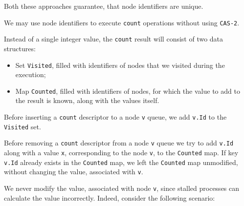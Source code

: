 \documentclass[times, dvipsnames,%
               languages={russian,english} %
              ]{itmo-student-thesis}
\begin{document}
\bigbreak

Both these approaches guarantee, that node identifiers are unique.

We may use node identifiers to execute \texttt{count} operations without using \texttt{CAS-2}. 

Instead of a single integer value, the \texttt{count} result will consist of two data structures:

\begin{itemize}
    \item Set \texttt{Visited}, filled with identifiers of nodes that we visited during the execution;
    
    \item Map \texttt{Counted}, filled with identifiers of nodes, for which the value to add to the result is known, along with the values itself.  
\end{itemize}

\bigbreak

Before inserting a \texttt{count} descriptor to a node \texttt{v} queue, we add \texttt{v.Id} to the \texttt{Visited} set. 

Before removing a \texttt{count} descriptor from a node \texttt{v} queue we try to add \texttt{v.Id} along with a value \texttt{x}, corresponding to the node \texttt{v}, to the \texttt{Counted} map. If key \texttt{v.Id} already exists in the \texttt{Counted} map, we left the \texttt{Counted} map unmodified, without changing the value, associated with \texttt{v}.

We never modify the value, associated with node \texttt{v}, since stalled processes can calculate the value incorrectly. Indeed, consider the following scenario:
\end{document}
